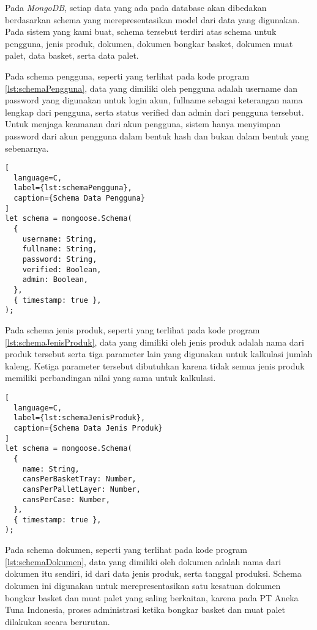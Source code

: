 Pada \emph{MongoDB}, setiap data yang ada pada database akan dibedakan berdasarkan schema yang merepresentasikan model dari data yang digunakan.
Pada sistem yang kami buat, schema tersebut terdiri atas schema untuk pengguna, jenis produk, dokumen, dokumen bongkar basket, dokumen muat palet, data basket, serta data palet.
\vspace{0.5ex}

Pada schema pengguna, seperti yang terlihat pada kode program \ref{lst:schemaPengguna}, data yang dimiliki oleh pengguna adalah username dan password yang digunakan untuk login akun, fullname sebagai keterangan nama lengkap dari pengguna, serta status verified dan admin dari pengguna tersebut.
Untuk menjaga keamanan dari akun pengguna, sistem hanya menyimpan password dari akun pengguna dalam bentuk hash dan bukan dalam bentuk yang sebenarnya.
\vspace{0.5ex}

\newpage

\begin{lstlisting}[
  language=C,
  label={lst:schemaPengguna},
  caption={Schema Data Pengguna}
]
let schema = mongoose.Schema(
  {
    username: String,
    fullname: String,
    password: String,
    verified: Boolean,
    admin: Boolean,
  },
  { timestamp: true },
);
\end{lstlisting}
\vspace{0.5ex}

Pada schema jenis produk, seperti yang terlihat pada kode program \ref{lst:schemaJenisProduk}, data yang dimiliki oleh jenis produk adalah nama dari produk tersebut serta tiga parameter lain yang digunakan untuk kalkulasi jumlah kaleng.
Ketiga parameter tersebut dibutuhkan karena tidak semua jenis produk memiliki perbandingan nilai yang sama untuk kalkulasi.
\vspace{0.5ex}

\begin{lstlisting}[
  language=C,
  label={lst:schemaJenisProduk},
  caption={Schema Data Jenis Produk}
]
let schema = mongoose.Schema(
  {
    name: String,
    cansPerBasketTray: Number,
    cansPerPalletLayer: Number,
    cansPerCase: Number,
  },
  { timestamp: true },
);
\end{lstlisting}
\vspace{0.5ex}

Pada schema dokumen, seperti yang terlihat pada kode program \ref{lst:schemaDokumen}, data yang dimiliki oleh dokumen adalah nama dari dokumen itu sendiri, id dari data jenis produk, serta tanggal produksi.
Schema dokumen ini digunakan untuk merepresentasikan satu kesatuan dokumen bongkar basket dan muat palet yang saling berkaitan, karena pada PT Aneka Tuna Indonesia, proses administrasi ketika bongkar basket dan muat palet dilakukan secara berurutan.
\vspace{0.5ex}

